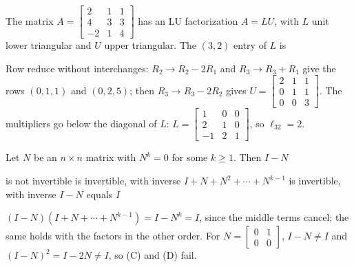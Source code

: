 \begin{question}[id=mat-19, marks=2]
The matrix $A = \begin{bmatrix} 2 & 1 & 1 \\ 4 & 3 & 3 \\ -2 & 1 & 4 \end{bmatrix}$ has an LU factorization $A = LU$, with $L$ unit lower triangular and $U$ upper triangular. The $(3, 2)$ entry of $L$ is
\begin{solution}
Row reduce without interchanges: $R_2 \to R_2 - 2R_1$ and $R_3 \to R_3 + R_1$ give the rows $(0, 1, 1)$ and $(0, 2, 5)$; then $R_3 \to R_3 - 2R_2$ gives $U = \begin{bmatrix} 2 & 1 & 1 \\ 0 & 1 & 1 \\ 0 & 0 & 3 \end{bmatrix}$. The multipliers go below the diagonal of $L$: $L = \begin{bmatrix} 1 & 0 & 0 \\ 2 & 1 & 0 \\ -1 & 2 & 1 \end{bmatrix}$, so $\ell_{32} = 2$.
\end{solution}
\end{question}

\begin{question}[id=mat-20, marks=2]
Let $N$ be an $n \times n$ matrix with $N^k = 0$ for some $k \ge 1$. Then $I - N$
\begin{options}
  \option is not invertible
  \correct is invertible, with inverse $I + N + N^2 + \cdots + N^{k-1}$
  \option is invertible, with inverse $I - N$
  \option equals $I$
\end{options}
\begin{solution}
$(I - N)(I + N + \cdots + N^{k-1}) = I - N^k = I$, since the middle terms cancel; the same holds with the factors in the other order. For $N = \begin{bmatrix} 0 & 1 \\ 0 & 0 \end{bmatrix}$, $I - N \ne I$ and $(I - N)^2 = I - 2N \ne I$, so (C) and (D) fail.
\end{solution}
\end{question}


